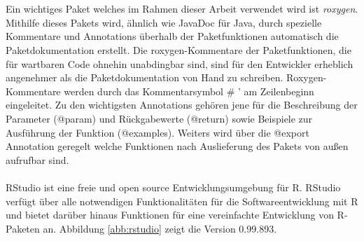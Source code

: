 \\
\\
Ein wichtiges Paket welches im Rahmen dieser Arbeit verwendet wird ist \emph{roxygen}. Mithilfe dieses Pakets wird, ähnlich wie JavaDoc für Java, durch spezielle Kommentare und Annotations überhalb der Paketfunktionen automatisch die Paketdokumentation erstellt. Die roxygen-Kommentare der Paketfunktionen, die für wartbaren Code ohnehin unabdingbar sind, sind für den Entwickler erheblich angenehmer als die Paketdokumentation von Hand zu schreiben. Roxygen-Kommentare werden durch das Kommentarsymbol \# ' am Zeilenbeginn eingeleitet. Zu den wichtigsten Annotations gehören jene für die Beschreibung der Parameter (@param) und Rückgabewerte (@return) sowie Beispiele zur Ausführung der Funktion (@examples). Weiters wird über die @export Annotation geregelt welche Funktionen nach Auslieferung des Pakets von außen aufrufbar sind.
\\
\\
RStudio ist eine freie und open source Entwicklungsumgebung für R. RStudio verfügt über alle notwendigen Funktionalitäten für die Softwareentwicklung mit R und bietet darüber hinaus Funktionen für eine vereinfachte Entwicklung von R-Paketen an. Abbildung \ref{abb:rstudio} zeigt die Version 0.99.893. 
